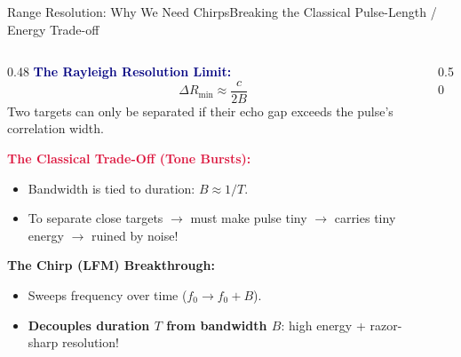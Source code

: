 \documentclass[aspectratio=169, 10pt]{beamer}
\begin{document}
\begin{frame}{Range Resolution: Why We Need Chirps}{Breaking the Classical Pulse-Length / Energy Trade-off}
    \begin{columns}[T]
        \begin{column}{0.48\textwidth}
            \textbf{\textcolor{navy}{The Rayleigh Resolution Limit:}}
            $$\Delta R_{\text{min}} \approx \frac{c}{2B}$$
            Two targets can only be separated if their echo gap exceeds the pulse's correlation width.
            
            \vspace{6pt}
            \textbf{\textcolor{crimson}{The Classical Trade-Off (Tone Bursts):}}
            \begin{itemize}\small
                \item Bandwidth is tied to duration: $B \approx 1/T$.
                \item To separate close targets $\to$ must make pulse tiny $\to$ carries tiny energy $\to$ ruined by noise!
            \end{itemize}
            
            \vspace{4pt}
            \textbf{\textcolor{emerald!80!black}{The Chirp (LFM) Breakthrough:}}
            \begin{itemize}\small
                \item Sweeps frequency over time ($f_0 \to f_0 + B$).
                \item \textbf{Decouples duration $T$ from bandwidth $B$}: high energy + razor-sharp resolution!
            \end{itemize}
        \end{column}
        
        \begin{column}{0.50\textwidth}
\end{column}
\end{columns}
\end{frame}
\end{document}

